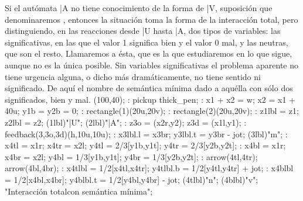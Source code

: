 \label{semántica mínima}
Si el autómata |A no tiene conocimiento de la forma de |V, suposición
que denominaremos ,
entonces la situación toma la forma de la interacción total, pero
distinguiendo, en las reacciones desde |U hasta |A, dos tipos de variables:
las significativas, en las que el valor 1 significa bien y el valor 0 mal, y
las neutras, que son el resto.  Llamaremos  a ésta, que es la que estudiaremos en lo que
sigue, aunque no es la única posible. Sin variables significativas el
problema aparente no tiene urgencia alguna, o dicho más dramáticamente,
no tiene sentido ni significado.  De aquí el nombre de semántica
mínima dado a aquélla con sólo dos significados, bien y mal.
\MTbeginfigure(100,40);
 \MT: pickup thick_pen;
 \MT: x1 + x2 = w; x2 = x1 + 40u; y1b = y2b = 0;
 \MT: rectangle(1)(20u,20v); %
 \MT: rectangle(2)(20u,20v); %
 \MT: z1lbl = z1; z2lbl = z2;
 \MTlabel(1lbl)"|U";
 \MTlabel(2lbl)"|A";
 \MT: z3o = (x2r,y2); z3d = (x1l,y1);
 \MT: feedback(3,3o,3d)(h,10u,10u);
 \MT: x3lbl.l = x3br; y3lbl.t = y3br - jot;
 \MTlabel(3lbl)"\no m";
 \MT: x4tl = x1r; x4tr = x2l; y4tl = 2/3[y1b,y1t]; y4tr = 2/3[y2b,y2t];
 \MT: x4bl = x1r; x4br = x2l; y4bl = 1/3[y1b,y1t]; y4br = 1/3[y2b,y2t];
 \MT: arrow(4tl,4tr); arrow(4bl,4br); %
 \MT: x4tlbl = 1/2[x4tl,x4tr]; y4tlbl.b = 1/2[y4tl,y4tr] + jot;
 \MT: x4blbl = 1/2[x4bl,x4br]; y4blbl.t = 1/2[y4bl,y4br] - jot;
 \MTlabel(4tlbl)"\no n"; \MTlabel(4blbl)"\no v";
\MTendfigure"Interacción total\cr con semántica mínima";

